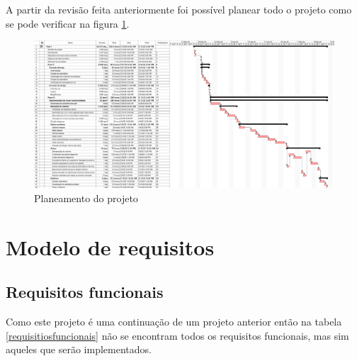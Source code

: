 \documentclass[12pt, twoside]{report}
\begin{document}
	A partir da revisão feita anteriormente foi possível planear todo o projeto como se pode verificar na figura 
	\ref{planeamentoinicial}.
	
		\clearpage
	\begin{landscape}
		\pagestyle{empty}
		
		\begin{figure}[H] 
			\centering 			\includegraphics[width=1.4\textwidth,height=1.4\textheight,keepaspectratio]{image/planeamentoInicial}
			\caption{Planeamento do projeto}
			\label{planeamentoinicial}
			
		\end{figure}
		
		
	\end{landscape}
	\chapter{Modelo de requisitos}
	\label{requisitos}
	\section{Requisitos funcionais}
	
	Como este projeto é uma continuação de um projeto anterior então na tabela \ref{requisitiosfuncionais} não se encontram todos os requisitos funcionais, mas sim aqueles que serão implementados. 
	
\end{document}

